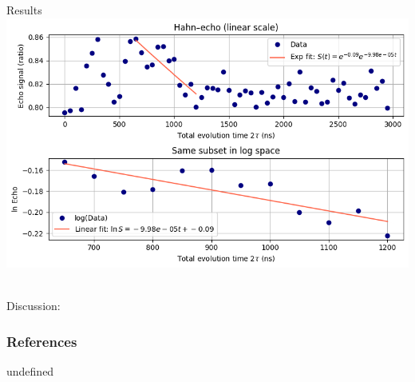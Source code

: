 \begin{frame}{Results}
    \centering
    \includegraphics[width=\linewidth]{presentation/figs/hahn.png}\

    Discussion:
\end{frame}



\begin{frame}[allowframebreaks] %
\frametitle{References}
\end{frame}


 
undefined